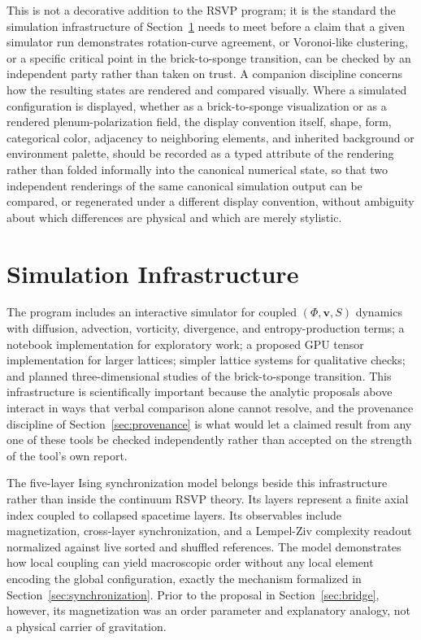 \documentclass[11pt]{article}
\begin{document}
This is not a decorative addition to the RSVP program; it is the standard the simulation infrastructure of Section~\ref{sec:simulation} needs to meet before a claim that a given simulator run demonstrates rotation-curve agreement, or Voronoi-like clustering, or a specific critical point in the brick-to-sponge transition, can be checked by an independent party rather than taken on trust. A companion discipline concerns how the resulting states are rendered and compared visually. Where a simulated configuration is displayed, whether as a brick-to-sponge visualization or as a rendered plenum-polarization field, the display convention itself, shape, form, categorical color, adjacency to neighboring elements, and inherited background or environment palette, should be recorded as a typed attribute of the rendering rather than folded informally into the canonical numerical state, so that two independent renderings of the same canonical simulation output can be compared, or regenerated under a different display convention, without ambiguity about which differences are physical and which are merely stylistic.

\section{Simulation Infrastructure}
\label{sec:simulation}

The program includes an interactive simulator for coupled $(\Phi,\mathbf{v},S)$ dynamics with diffusion, advection, vorticity, divergence, and entropy-production terms; a notebook implementation for exploratory work; a proposed GPU tensor implementation for larger lattices; simpler lattice systems for qualitative checks; and planned three-dimensional studies of the brick-to-sponge transition. This infrastructure is scientifically important because the analytic proposals above interact in ways that verbal comparison alone cannot resolve, and the provenance discipline of Section~\ref{sec:provenance} is what would let a claimed result from any one of these tools be checked independently rather than accepted on the strength of the tool's own report.

The five-layer Ising synchronization model belongs beside this infrastructure rather than inside the continuum RSVP theory. Its layers represent a finite axial index coupled to collapsed spacetime layers. Its observables include magnetization, cross-layer synchronization, and a Lempel-Ziv complexity readout normalized against live sorted and shuffled references. The model demonstrates how local coupling can yield macroscopic order without any local element encoding the global configuration, exactly the mechanism formalized in Section~\ref{sec:synchronization}. Prior to the proposal in Section~\ref{sec:bridge}, however, its magnetization was an order parameter and explanatory analogy, not a physical carrier of gravitation.
\end{document}
